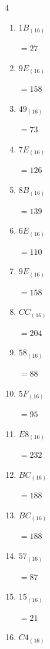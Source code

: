 \begin{multicols}{4}
\begin{enumerate}
        $=245$

  \item $1B_{(16)}$

        $=27$

  \item $9E_{(16)}$

        $=158$

  \item $49_{(16)}$

        $=73$

  \item $7E_{(16)}$

        $=126$

  \item $8B_{(16)}$

        $=139$

  \item $6E_{(16)}$

        $=110$

  \item $9E_{(16)}$

        $=158$

  \item $CC_{(16)}$

        $=204$

  \item $58_{(16)}$

        $=88$

  \item $5F_{(16)}$

        $=95$

  \item $E8_{(16)}$

        $=232$

  \item $BC_{(16)}$

        $=188$

  \item $BC_{(16)}$

        $=188$

\columnbreak %

\resetques

  \item $57_{(16)}$

        $=87$

  \item $15_{(16)}$

        $=21$

  \item $C4_{(16)}$


\end{enumerate}
\end{multicols}
